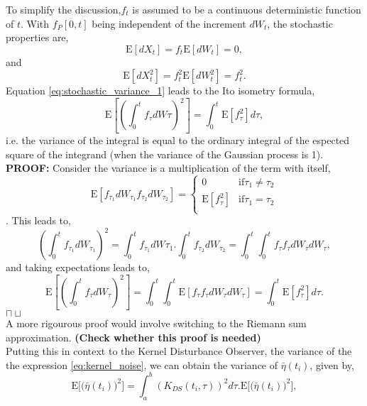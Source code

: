 \documentclass{article}
\newcommand{\eop}{\hfill $\sqcap\!\!\!\!\sqcup$} %
\begin{document}
To simplify the discussion,$f_t$ is assumed to be a continuous deterministic function of $t$. With $f_P{[0,t]}$ being independent of the increment $dW_t$, the stochastic properties are, 
\begin{equation}
\text{E}[dX_t] = f_t\text{E}[dW_t] = 0,
\end{equation}
and
\begin{equation} 
\label{eq:stochastic_variance_1}
\text{E}[dX_t^2] = f_t^2\text{E}[dW_t^2]=f_t^2.
\end{equation}
Equation \ref{eq:stochastic_variance_1} leads to the Ito isometry formula, 
\begin{equation}
\label{eq:ito_isometry}
\text{E}\left[\left( \int_0^t f_\tau dW\tau   \right)^2\right] = \int_0^t \text{E}\left[ f_\tau^2\right] d\tau ,
\end{equation}
i.e. the variance of the integral is equal to the ordinary integral of the espected square of the integrand (when the variance of the Gaussian process is 1). \\\textbf{PROOF:} Consider the variance is a multiplication of the term with itself, 
\[ \text{E}[f_{\tau_1}dW_{\tau_1} f_{\tau_2}dW_{\tau_2}] = 
   \begin{cases} 
      0 & \text{if} \tau_1 \neq \tau_2  \\
      \text{E}[ f_\tau^2] & \text{if} \tau_1 = \tau_2 \\
       
   \end{cases}
\].
This leads to, 
$$
\left(\int_0^t f_{\tau_1} dW_{\tau_1} \right)^2 = \int_0^t f_{\tau_1} dW{\tau_1} . \int_0^t f_{\tau_2} dW_{\tau_2} = \int_0^t \int_0^t f_{\tau} f_{\tau} dW_\tau dW_\tau, 
$$ 
and taking expectations leads to,
$$
\text{E} \left[ \left(  \int_0^t f_\tau dW_\tau \right)^2 \right] = \int_0^t \int_0^t \text{E}[f_{\tau} f_{\tau} dW_\tau dW_\tau] = \int_0^t \text{E}\left[ f_\tau^2\right] d\tau. 
$$ 
\hspace*{0pt}\hfill \eop\\
A more rigourous proof would involve switching to the Riemann sum approximation. \textbf{(Check whether this proof is needed)} \\Putting this in context to the Kernel Disturbance Observer, the variance of the the expression \ref{eq:kernel_noise}, we can obtain the variance of $\bar{\eta}(t_i)$, given by, 
\begin{equation}
\text{E}\Big[\big(\bar{\eta}(t_i)\big)^2\Big] = \int_a^b \left(K_{DS}(t_i,\tau)\right)^2 d\tau . \text{E}\Big[\big( \bar{\eta}(t_i) \big)^2\Big], 	
\end{equation}
\end{document}
